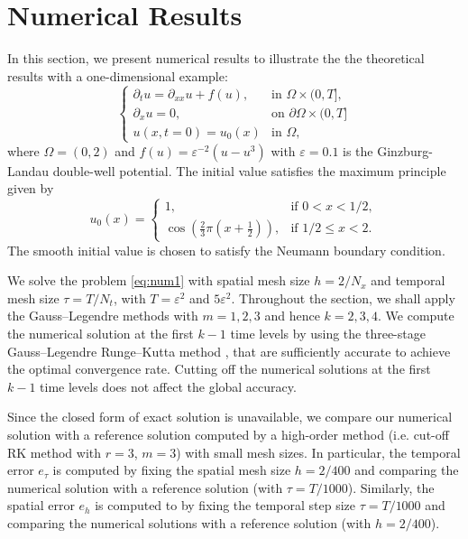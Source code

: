 \documentclass[a4paper, oneside]{book}
\def\l{\left}
\def\r{\right}
\def\epsilon{\varepsilon}
\begin{document}
\section{Numerical Results}
In this section, we present numerical results to illustrate the the theoretical results
with a one-dimensional example:
\begin{equation}\label{eq:num1}
\begin{cases}
  \partial_t u = \partial_{xx}u + f(u), & \mbox{in } \Omega \times(0,T], \\
  \partial_x u = 0, & \mbox{on } \partial\Omega \times(0,T] \\
  u(x,t=0) = u_0(x) & \mbox{in } \Omega,
\end{cases}
\end{equation}
where  $\Omega = (0,2)$ and $f(u) = \epsilon^{-2}(u-u^3)$ with $\epsilon=0.1$ is
the Ginzburg-Landau double-well potential.
The initial value satisfies the maximum principle given by
\begin{equation}\label{eq:num1_init}
u_0(x) = \begin{cases}
           1, & \mbox{if } 0<x<1/2, \\
           \cos\l(\frac23\pi\l(x+\frac12\r)\r), & \mbox{if }  1/2\leq x<2.
         \end{cases}
\end{equation}
The smooth initial value is chosen to satisfy the Neumann boundary condition.

We solve the problem \eqref{eq:num1} with spatial mesh size $h = 2/N_x$
and temporal mesh size $\tau = T / N_t$, with $T=\epsilon^2$ and $5\epsilon^2$.
Throughout the section, we shall apply the Gauss--Legendre methods with $m=1,2,3$ and hence $k=2,3,4$.
We compute the numerical solution at the first $k -1$ time levels by using the three-stage
Gauss--Legendre Runge--Kutta method \cite[Table 5.2]{HairerWanner:2010}, that are sufficiently accurate to achieve the optimal convergence rate.
Cutting off the numerical solutions at the first $k - 1$ time levels does not affect the global accuracy.



Since the closed form of exact solution is
unavailable, we compare our numerical solution with a reference solution computed by a
high-order method (i.e. cut-off RK method with $r=3$, $m=3$) with small mesh sizes.
In particular, the temporal error $e_\tau$
is computed by fixing the spatial mesh size $h = 2/400$
and comparing the numerical solution with
a reference solution (with $\tau = T/1000$).
Similarly, the spatial error $e_h$
is computed to by fixing the temporal step size
$\tau = T/1000$ and comparing the numerical solutions with
a reference solution (with  $h = 2/400$).
\end{document}
